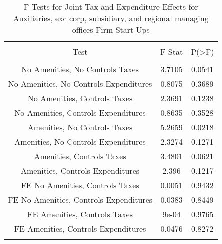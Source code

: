 
\begin{table}[!htbp] \centering 
  \caption{F-Tests for Joint Tax and Expenditure Effects for Auxiliaries, exc corp, subsidiary, and regional managing offices Firm Start Ups} 
  \label{95Ftests} 
\begin{tabular}{@{\extracolsep{5pt}} ccc} 
\\[-1.8ex]\hline 
\hline \\[-1.8ex] 
Test & F-Stat & P(\textgreater F) \\ 
\hline \\[-1.8ex] 
No Amenities, No Controls Taxes & 3.7105 & 0.0541 \\ 
No Amenities, No Controls Expenditures & 0.8075 & 0.3689 \\ 
No Amenities, Controls Taxes & 2.3691 & 0.1238 \\ 
No Amenities, Controls Expenditures & 0.8635 & 0.3528 \\ 
Amenities, No Controls Taxes & 5.2659 & 0.0218 \\ 
Amenities, No Controls Expenditures & 2.3274 & 0.1271 \\ 
Amenities, Controls Taxes & 3.4801 & 0.0621 \\ 
Amenities, Controls Expenditures & 2.396 & 0.1217 \\ 
FE No Amenities, Controls Taxes & 0.0051 & 0.9432 \\ 
FE No Amenities, Controls Expenditures & 0.0383 & 0.8449 \\ 
FE Amenities, Controls Taxes & 9e-04 & 0.9765 \\ 
FE Amenities, Controls Expenditures & 0.0476 & 0.8272 \\ 
\hline \\[-1.8ex] 
\end{tabular} 
\end{table} 
